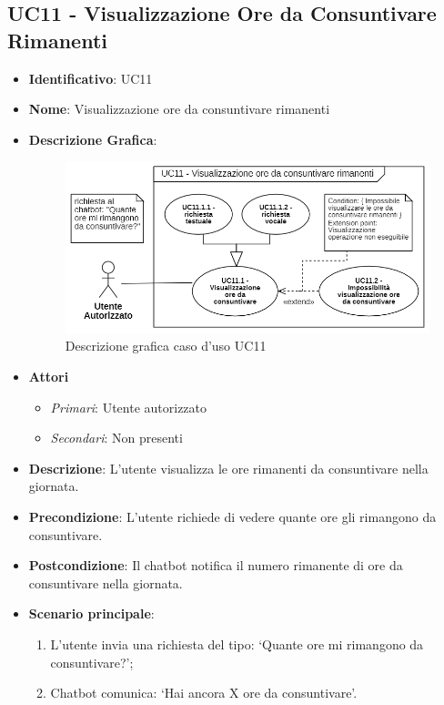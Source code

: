 \subsection{UC11 - Visualizzazione Ore da Consuntivare Rimanenti }
\begin{itemize}
	\item \textbf{Identificativo}: UC11
	\item \textbf{Nome}: Visualizzazione ore da consuntivare rimanenti
	\item \textbf{Descrizione Grafica}:
	\begin{figure}[h]
		\centering
		\includegraphics[scale=0.80]{images/UC11.png} 
		\caption{Descrizione grafica caso d'uso UC11}
	 \end{figure}

	\item \textbf{Attori}
	\begin{itemize} 
		\item \textit{Primari}: Utente autorizzato
		\item \textit{Secondari}: Non presenti
	\end{itemize}
	\item \textbf{Descrizione}: L'utente visualizza le ore rimanenti da consuntivare nella giornata.
	\item \textbf{Precondizione}: L'utente richiede di vedere quante ore gli rimangono da consuntivare.
	\item \textbf{Postcondizione}: Il chatbot notifica il numero rimanente di ore da consuntivare nella giornata.
	\item \textbf{Scenario principale}: \begin{enumerate}
		\item L'utente invia una richiesta del tipo: `Quante ore mi rimangono da consuntivare?';
		\item Chatbot comunica: `Hai ancora X ore da consuntivare'.
	\end{enumerate}
\end{itemize}

